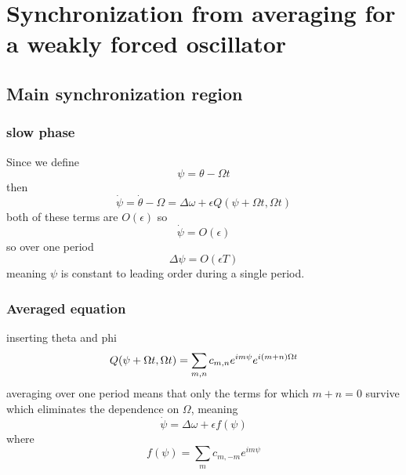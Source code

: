 \clearpage
\section{Synchronization from averaging for a weakly forced oscillator}
\subsection{Main synchronization region}
\subsubsection{slow phase}
Since we define 
\begin{equation}
    \psi = \theta - \Omega t
\end{equation}
then 
\begin{equation}
    \dot{\psi}=\dot{\theta}-\Omega=\Delta \omega+\epsilon Q(\psi+\Omega t, \Omega t)
\end{equation}
both of these terms are \(O(\epsilon)\) so 
\begin{equation}
    \dot{\psi}=O(\epsilon)
\end{equation}
so over one period 
\begin{equation}
    \Delta\psi = O(\epsilon T)
\end{equation}
meaning \(\psi\) is constant to leading order during a single period.
\subsubsection{Averaged equation}
inserting theta and phi
\begin{equation}
    Q(\psi+\Omega t,\Omega t)=\sum_{m,n}c_{m,n}e^{im\psi}e^{i\left(m+n\right)\Omega t}
\end{equation}
averaging over one period means that only the terms for which \(m+n=0\) survive which eliminates the dependence on \(\Omega\), meaning 
\begin{equation}
    \dot{\psi}=\Delta\omega + \epsilon f(\psi)
\end{equation}
where 
\begin{equation}
    f(\psi)=\sum_{m}c_{m,-m}e^{im\psi}
\end{equation}
